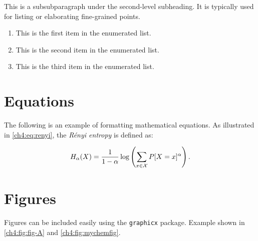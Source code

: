 \begin{subsubparagraph}
This is a subsubparagraph under the second-level subheading. It is typically used for listing or elaborating fine-grained points.
\end{subsubparagraph}

\begin{enumerate}[itemindent=\subsubparitemindent]
    \label{ch4:enum:example}
    \item This is the first item in the enumerated list.
    \item This is the second item in the enumerated list.
    \item This is the third item in the enumerated list.
\end{enumerate}

    
\section{Equations}
\begin{paragraph}
The following is an example of formatting mathematical equations. As illustrated in \autoref{ch4:eq:renyi}, the {\em R\'enyi entropy} is defined as:
\end{paragraph}

\begin{equation}
\label{ch4:eq:renyi}
H_{\alpha}(X) =
\frac{1}{1-\alpha}
\log \left(\sum_{x \in {\cal X}}P[X=x]^{\alpha} \right) .
\end{equation}

\section{Figures}
\begin{paragraph}
Figures can be included easily using the \texttt{graphicx} package. Example shown in \autoref{ch4:fig:fig-A} and \autoref{ch4:fig:mychemfig}.
\end{paragraph}

